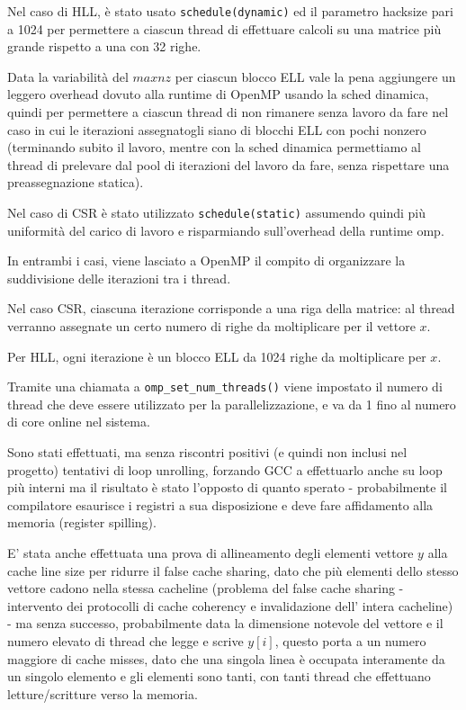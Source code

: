 \documentclass[a4paper,9pt]{extarticle}
\begin{document}
Nel caso di HLL, è stato usato \texttt{schedule(dynamic)} ed il parametro hacksize pari a 1024 per permettere a ciascun
thread di effettuare calcoli su una matrice più grande rispetto a una con 32 righe. 

Data la variabilità del $maxnz$ per
ciascun blocco ELL vale la pena aggiungere un leggero overhead dovuto alla runtime di OpenMP usando la sched dinamica,
quindi per permettere a ciascun thread di non rimanere senza lavoro da fare nel caso in cui le iterazioni assegnatogli
siano di blocchi ELL con pochi nonzero (terminando subito il lavoro, mentre con la sched dinamica permettiamo al thread di
prelevare dal pool di iterazioni del lavoro da fare, senza rispettare una preassegnazione statica).

Nel caso di CSR è stato utilizzato \texttt{schedule(static)} assumendo quindi più uniformità del carico di lavoro
e risparmiando sull'overhead della runtime omp.

In entrambi i casi, viene lasciato a OpenMP il compito di organizzare la suddivisione delle iterazioni tra i thread.

Nel caso CSR, ciascuna iterazione corrisponde a una riga della matrice: al thread verranno assegnate un certo
numero di righe da moltiplicare per il vettore $x$.

Per HLL, ogni iterazione è un blocco ELL da 1024 righe da moltiplicare per $x$.

Tramite una chiamata a \texttt{omp\_set\_num\_threads()} viene impostato il numero di thread che deve essere utilizzato
per la parallelizzazione, e va da 1 fino al numero di core online nel sistema.

Sono stati effettuati, ma senza riscontri positivi (e quindi non inclusi nel progetto) tentativi di loop unrolling,
forzando GCC a effettuarlo anche su loop più interni ma il risultato è stato l'opposto di quanto sperato - probabilmente
il compilatore esaurisce i registri a sua disposizione e deve fare affidamento alla memoria (register spilling).

E' stata anche effettuata una prova di allineamento degli elementi vettore $y$ alla cache line size per ridurre il
false cache sharing, dato che più elementi dello stesso vettore
cadono nella stessa cacheline (problema del false
cache sharing - intervento dei protocolli di cache coherency e invalidazione dell' intera cacheline) - ma senza successo, probabilmente data la dimensione
notevole del vettore e il numero elevato di thread che legge e scrive $y[i]$, questo porta a un numero maggiore di cache 
misses, dato che una singola linea è occupata interamente da un singolo elemento e gli elementi sono tanti, con tanti
thread che effettuano letture/scritture verso la memoria.
\end{document}
